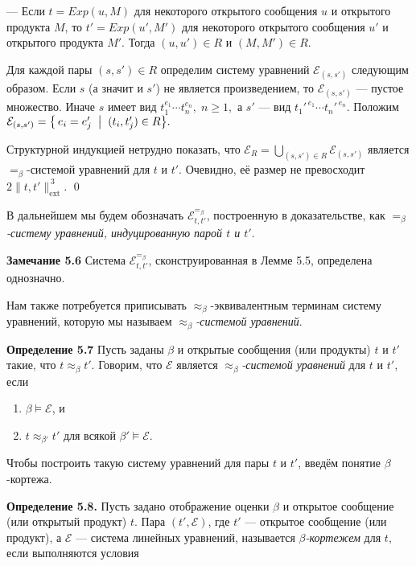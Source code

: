 — Если $t=Exp(u,M)$ для некоторого открытого сообщения $u$
  и открытого продукта $M$, то $t'=Exp(u',M')$
  для некоторого открытого сообщения $u'$ и открытого продукта $M'$.
  Тогда $(u,u')\in R$ и $(M,M')\in R$.

Для каждой пары $(s,s')\in R$ определим систему уравнений
$\mathcal E_{(s,s')}$ следующим образом.
Если $s$ (а значит и $s'$) не является произведением,
то $\mathcal E_{(s,s')}$ — пустое множество.
Иначе $s$ имеет вид
$t_{1}^{e_{1}}\!\cdots t_{n}^{e_{n}},\;n\ge 1,$
а $s'$ — вид
$t_{1}'^{\,e_{1}}\!\cdots t_{n}'^{\,e_{n}}$.
Положим
\(
  \mathcal E_{(s,s')}=\bigl\{\,e_{i}=e_{j}' \;\bigm|\;
        (t_{i},t_{j}')\in R\bigr\}.
\)

Структурной индукцией нетрудно показать, что
\(
  \mathcal E_{R}= \bigcup_{(s,s')\in R}\mathcal E_{(s,s')}
\)
является $=_{\beta}$-системой уравнений для $t$ и $t'$.
Очевидно, её размер не превосходит
$2\lVert t,t'\rVert_{\text{ext}}^{\,3}$. \qed

В дальнейшем мы будем обозначать
$\mathcal E^{=_{\beta}}_{t,t'}$, построенную в доказательстве,
как \emph{$=_{\beta}$-систему уравнений, индуцированную парой $t$ и $t'$}.

\textbf{Замечание 5.6}
Система $\mathcal E^{=_{\beta}}_{t,t'}$, сконструированная в Лемме 5.5,
определена однозначно.

Нам также потребуется приписывать
$\approx_{\beta}$-эквивалентным терминам
систему уравнений, которую мы называем
\emph{$\approx_{\beta}$-системой уравнений}.

\textbf{Определение 5.7}
Пусть заданы $\beta$ и открытые сообщения (или продукты) $t$ и $t'$
такие, что $t \approx_{\beta} t'$.
Говорим, что $\mathcal E$ является
\emph{$\approx_{\beta}$-системой уравнений} для $t$ и $t'$, если

\begin{enumerate}
  \item $\beta\models\mathcal E$, и
  \item $t \approx_{\beta'} t'$ для всякой $\beta'\models\mathcal E$.
\end{enumerate}

Чтобы построить такую систему уравнений для пары $t$ и $t'$,
введём понятие $\beta$-кортежа.

\textbf{Определение 5.8.}
Пусть задано отображение оценки $\beta$ и открытое сообщение
(или открытый продукт) $t$.
Пара $(t',\mathcal E)$, где $t'$ — открытое сообщение (или продукт),
а $\mathcal E$ — система линейных уравнений,
называется \emph{$\beta$-кортежем} для $t$, если выполняются условия

